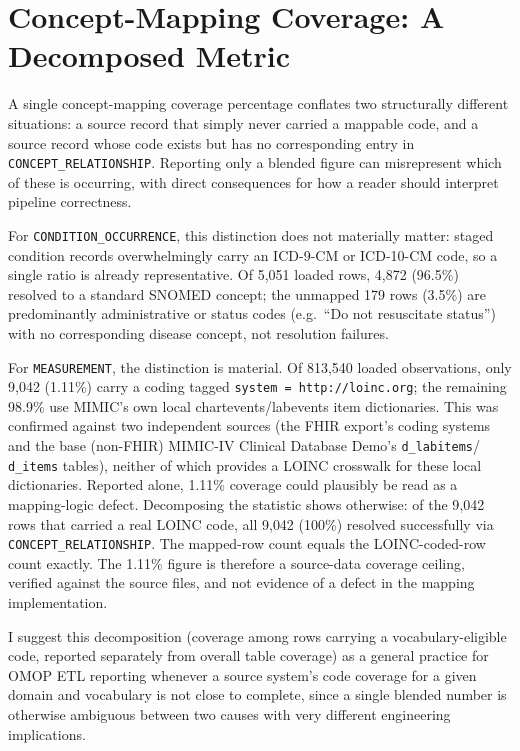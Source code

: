 \documentclass[11pt]{article}
\begin{document}
\section{Concept-Mapping Coverage: A Decomposed Metric}
\label{sec:coverage}

A single concept-mapping coverage percentage conflates two structurally
different situations: a source record that simply never carried a
mappable code, and a source record whose code exists but has no
corresponding entry in \texttt{CONCEPT\_RELATIONSHIP}. Reporting only a
blended figure can misrepresent which of these is occurring, with direct
consequences for how a reader should interpret pipeline correctness.

For \texttt{CONDITION\_OCCURRENCE}, this distinction does not materially
matter: staged condition records overwhelmingly carry an ICD-9-CM or
ICD-10-CM code, so a single ratio is already representative. Of 5{,}051
loaded rows, 4{,}872 (96.5\%) resolved to a standard SNOMED concept; the
unmapped 179 rows (3.5\%) are predominantly administrative or status codes
(e.g.\ ``Do not resuscitate status'') with no corresponding disease
concept, not resolution failures.

For \texttt{MEASUREMENT}, the distinction is material. Of 813{,}540 loaded
observations, only 9{,}042 (1.11\%) carry a coding tagged
\texttt{system\ =\ http://loinc.org}; the remaining 98.9\% use MIMIC's own
local chartevents/labevents item dictionaries. This was confirmed against
two independent sources (the FHIR export's coding systems and the base
(non-FHIR) MIMIC-IV Clinical Database Demo's \texttt{d\_labitems}/
\texttt{d\_items} tables), neither of which provides a LOINC crosswalk for
these local dictionaries. Reported alone, 1.11\% coverage could plausibly
be read as a mapping-logic defect. Decomposing the statistic shows
otherwise: of the 9{,}042 rows that carried a real LOINC code, all 9{,}042
(100\%) resolved successfully via \texttt{CONCEPT\_RELATIONSHIP}. The
mapped-row count equals the LOINC-coded-row count exactly. The 1.11\%
figure is therefore a source-data coverage ceiling, verified against
the source files, and not evidence of a defect in the mapping implementation.

I suggest this decomposition (coverage among rows carrying a
vocabulary-eligible code, reported separately from overall table coverage)
as a general practice for OMOP ETL reporting whenever a source
system's code coverage for a given domain and vocabulary is not close to
complete, since a single blended number is otherwise ambiguous between two
causes with very different engineering implications.
\end{document}
